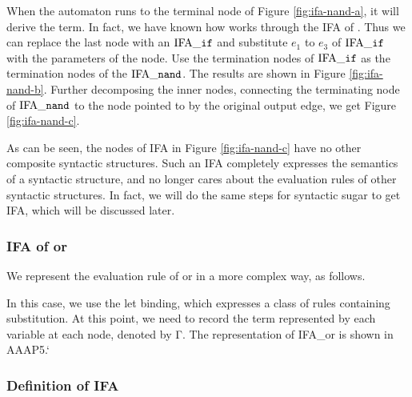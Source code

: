 When the automaton runs to the terminal node of Figure \ref{fig:ifa-nand-a}, it will derive the  term. In fact, we have known how  works through the IFA of . Thus we can replace the last node with an $\text{IFA}\_\mbox{\tt if}$ and substitute $e_1$ to $e_3$ of $\text{IFA}\_\mbox{\tt if}$ with the parameters of the node. Use the termination nodes of $\text{IFA}\_\mbox{\tt if}$ as the termination nodes of the $\text{IFA}\_\mbox{\tt nand}$. The results are shown in Figure \ref{fig:ifa-nand-b}. Further decomposing the inner nodes, connecting the terminating node of $\text{IFA}\_\mbox{\tt nand}$ to the node pointed to by the original output edge, we get Figure \ref{fig:ifa-nand-c}. 

As can be seen, the nodes of IFA in Figure \ref{fig:ifa-nand-c} have no other composite syntactic structures. Such an IFA completely expresses the semantics of a syntactic structure, and no longer cares about the evaluation rules of other syntactic structures. In fact, we will do the same steps for syntactic sugar to get IFA, which will be discussed later.

\subsubsection{IFA of or}

We represent the evaluation rule of or in a more complex way, as follows. 

In this case, we use the let binding, which expresses a class of rules containing substitution. At this point, we need to record the term represented by each variable at each node, denoted by Γ. The representation of IFA\_or is shown in AAAP5.`

\subsubsection{Definition of IFA}


